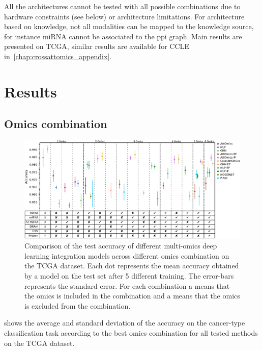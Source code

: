 \documentclass[../main.tex]{subfiles}
\begin{document}
	    All the architectures cannot be tested with all possible combinations due to hardware constraints (see below) or architecture limitations.
	    For architecture based on knowledge, not all modalities can be mapped to the knowledge source, for instance miRNA cannot be associated to the \gls{ppi} graph.
	    Main results are presented on TCGA, similar results are available for CCLE in~\cref{chap:crossattomics_appendix}.

\section{Results}

	\subsection{Omics combination}
	    \begin{figure}[htbp]
	        \centering
	        \includegraphics[width=1\textwidth]{tcga_perf_omics_comb.pdf}
	        \caption{Comparison of the test accuracy of different multi-omics deep learning integration models across different omics combination on the TCGA dataset. Each dot represents the mean accuracy obtained by a model on the test set after 5 different training. The error-bars represents the standard-error. For each combination a \cmark means that the omics is included in the combination and a \xmark means that the omics is excluded from the combination.}
	        \label{fig:tcga_perf_comb}
	    \end{figure}
	     shows the average and standard deviation of the accuracy on the cancer-type classification task according to the best omics combination for all tested methods on the TCGA dataset.
\end{document}
